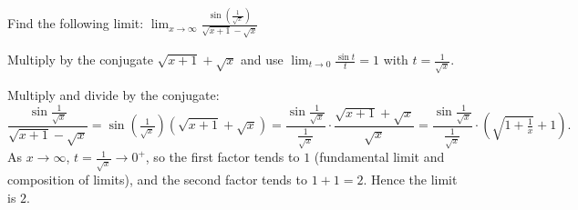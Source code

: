 
\begin{question}
Find the following limit:
$\displaystyle\lim_{x\to\infty}\frac{\sin\left(\frac{1}{\sqrt x}\right)}{\sqrt{x+1}-\sqrt x}$
\end{question}

\begin{hint}
Multiply by the conjugate $\sqrt{x+1}+\sqrt x$ and use $\lim_{t\to0}\frac{\sin t}{t}=1$ with $t=\frac1{\sqrt x}$.
\end{hint}

\begin{solution}
Multiply and divide by the conjugate:
\[ \frac{\sin\frac1{\sqrt x}}{\sqrt{x+1}-\sqrt x}=\sin\!\left(\tfrac1{\sqrt x}\right)\left(\sqrt{x+1}+\sqrt x\right)
=\frac{\sin\frac1{\sqrt x}}{\frac1{\sqrt x}}\cdot\frac{\sqrt{x+1}+\sqrt x}{\sqrt x}
=\frac{\sin\frac1{\sqrt x}}{\frac1{\sqrt x}}\cdot\left(\sqrt{1+\tfrac1x}+1\right). \]
As $x\to\infty$, $t=\frac1{\sqrt x}\to0^+$, so the first factor tends to $1$ (fundamental limit and composition of limits), and the second factor tends to $1+1=2$. Hence the limit is $\boxed{2}$.
\end{solution}
